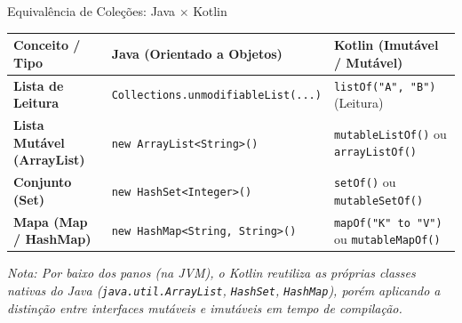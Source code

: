 \documentclass[aspectratio=169]{beamer}
\begin{document}
\begin{frame}{Equivalência de Coleções: Java $\times$ Kotlin}
  \vspace{0.3em}
  \centering
  \begin{table}
    \scriptsize
    \begin{tabular}{l l l}
      \toprule
      \textbf{Conceito / Tipo} & \textbf{Java (Orientado a Objetos)} & \textbf{Kotlin (Imutável / Mutável)} \\
      \midrule
      \textbf{Lista de Leitura} & \texttt{Collections.unmodifiableList(...)} & \texttt{listOf("A", "B")} (Leitura) \\[4pt]
      \textbf{Lista Mutável (ArrayList)} & \texttt{new ArrayList<String>()} & \texttt{mutableListOf()} ou \texttt{arrayListOf()} \\[4pt]
      \textbf{Conjunto (Set)} & \texttt{new HashSet<Integer>()} & \texttt{setOf()} ou \texttt{mutableSetOf()} \\[4pt]
      \textbf{Mapa (Map / HashMap)} & \texttt{new HashMap<String, String>()} & \texttt{mapOf("K" to "V")} ou \texttt{mutableMapOf()} \\
      \bottomrule
    \end{tabular}
  \end{table}
  \vspace{0.3em}
  {\tiny \textit{Nota: Por baixo dos panos (na JVM), o Kotlin reutiliza as próprias classes nativas do Java (\texttt{java.util.ArrayList}, \texttt{HashSet}, \texttt{HashMap}), porém aplicando a distinção entre interfaces mutáveis e imutáveis em tempo de compilação.}}
\end{frame}
\end{document}
